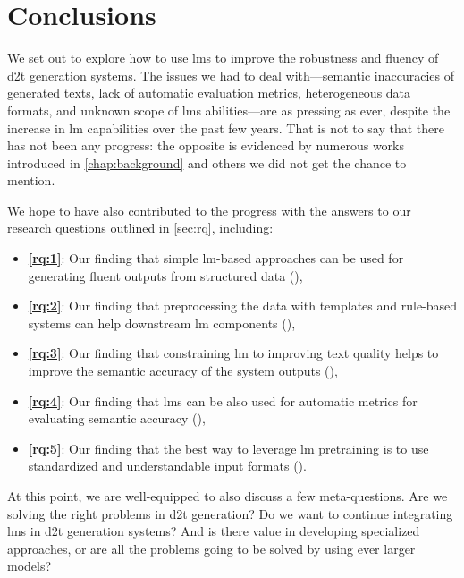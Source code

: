 
\chapter{Conclusions}
\label{chap:conclusions}

We set out to explore how to use \acp{lm} to improve the robustness and fluency of \ac{d2t} generation systems. The issues we had to deal with---semantic inaccuracies of generated texts, lack of automatic evaluation metrics, heterogeneous data formats, and unknown scope of \acp{lm} abilities---are as pressing as ever, despite the increase in \ac{lm} capabilities over the past few years. That is not to say that there has not been any progress: the opposite is evidenced by numerous works introduced in \autoref{chap:background} and others we did not get the chance to mention.

We hope to have also contributed to the progress with the answers to our research questions outlined in \autoref{sec:rq}, including:
\begin{itemize}
    \item \textbf{\ref{rq:1}}: Our finding that simple \ac{lm}-based approaches can be used for generating fluent outputs from structured data (),
    \item \textbf{\ref{rq:2}}: Our finding that preprocessing the data with templates and rule-based systems can help downstream \ac{lm} components (),
    \item \textbf{\ref{rq:3}}: Our finding that constraining \ac{lm} to improving text quality helps to improve the semantic accuracy of the system outputs (),
    \item \textbf{\ref{rq:4}}: Our finding that \acp{lm} can be also used for automatic metrics for evaluating semantic accuracy (),
    \item \textbf{\ref{rq:5}}: Our finding that the best way to leverage \ac{lm} pretraining is to use standardized and understandable input formats ().
\end{itemize}

At this point, we are well-equipped to also discuss a few meta-questions. Are we solving the right problems in \ac{d2t} generation? Do we want to continue integrating \acp{lm} in \ac{d2t} generation systems? And is there value in developing specialized approaches, or are all the problems going to be solved by using ever larger models?

